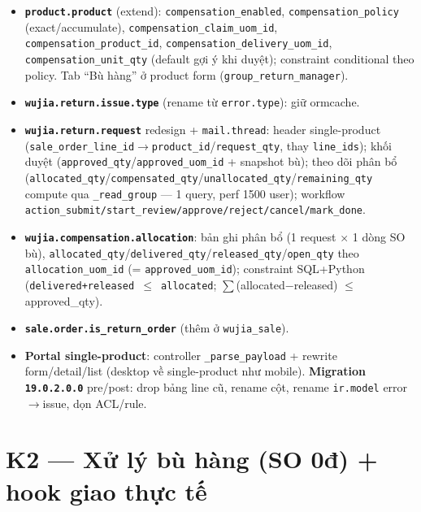 \begin{itemize}
  \item \textbf{\texttt{product.product}} (extend): \texttt{compensation\_enabled}, \texttt{compensation\_policy}
    (exact/accumulate), \texttt{compensation\_claim\_uom\_id}, \texttt{compensation\_product\_id},
    \texttt{compensation\_delivery\_uom\_id}, \texttt{compensation\_unit\_qty} (default gợi ý khi duyệt);
    constraint conditional theo policy. Tab ``Bù hàng'' ở product form (\texttt{group\_return\_manager}).
  \item \textbf{\texttt{wujia.return.issue.type}} (rename từ \texttt{error.type}): giữ ormcache.
  \item \textbf{\texttt{wujia.return.request}} redesign + \texttt{mail.thread}: header single-product
    (\texttt{sale\_order\_line\_id}$\to$\texttt{product\_id}/\texttt{request\_qty}, thay \texttt{line\_ids});
    khối duyệt (\texttt{approved\_qty}/\texttt{approved\_uom\_id} + snapshot bù); theo dõi phân bổ
    (\texttt{allocated\_qty}/\texttt{compensated\_qty}/\texttt{unallocated\_qty}/\texttt{remaining\_qty}
    compute qua \texttt{\_read\_group} --- 1 query, perf 1500 user); workflow
    \texttt{action\_submit/start\_review/approve/reject/cancel/mark\_done}.
  \item \textbf{\texttt{wujia.compensation.allocation}}: bản ghi phân bổ (1 request $\times$ 1 dòng SO bù),
    \texttt{allocated\_qty}/\texttt{delivered\_qty}/\texttt{released\_qty}/\texttt{open\_qty} theo
    \texttt{allocation\_uom\_id} (= \texttt{approved\_uom\_id}); constraint SQL+Python
    (\texttt{delivered+released $\le$ allocated}; $\sum$(allocated$-$released) $\le$ approved\_qty).
  \item \textbf{\texttt{sale.order.is\_return\_order}} (thêm ở \texttt{wujia\_sale}).
  \item \textbf{Portal single-product}: controller \texttt{\_parse\_payload} + rewrite form/detail/list
    (desktop về single-product như mobile). \textbf{Migration \texttt{19.0.2.0.0}} pre/post: drop bảng
    line cũ, rename cột, rename \texttt{ir.model} error$\to$issue, dọn ACL/rule.
\end{itemize}

\section{K2 --- Xử lý bù hàng (SO 0đ) + hook giao thực tế}

